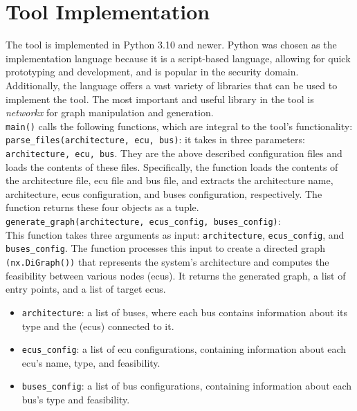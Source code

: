 \section{Tool Implementation}
\label{sec:implementation}

The tool is implemented in Python 3.10 and newer.
Python was chosen as the implementation language because it is a script-based language, allowing for quick prototyping and development,
and is popular in the security domain.
Additionally, the language offers a vast variety of libraries that can be used to implement the tool.
The most important and useful library in the tool is \textit{networkx} for graph manipulation and generation.\\

\texttt{main()} calls the following functions, which are integral to the tool's functionality:\\

\texttt{parse\_files(architecture, ecu, bus)}: it takes in three parameters: \texttt{architecture, ecu, bus}.
They are the above described configuration files and loads the contents of these files. 
Specifically, the function loads the contents of the architecture file, \gls{ecu} file and bus file, 
and extracts the architecture name, architecture, \gls{ecu}s configuration, and buses configuration, respectively. 
The function returns these four objects as a tuple.\\

\texttt{generate\_graph(architecture, ecus\_config, buses\_config)}:\\
This function takes three arguments as input: 
\texttt{architecture}, \texttt{ecus\_config}, and \texttt{buses\_config}. 
The function processes this input to create a directed graph \texttt{(nx.DiGraph())} 
that represents the system's architecture and computes the feasibility between various nodes (\gls{ecu}s). 
It returns the generated graph, a list of entry points, and a list of target \gls{ecu}s.
\begin{itemize}
    \item \texttt{architecture}: a list of buses, where each bus contains information about its type and the (\gls{ecu}s) connected to it.
    \item \texttt{ecus\_config}: a list of \gls{ecu} configurations, containing information about each \gls{ecu}'s name, type, and feasibility.
    \item \texttt{buses\_config}: a list of bus configurations, containing information about each bus's type and feasibility.  
\end{itemize}

